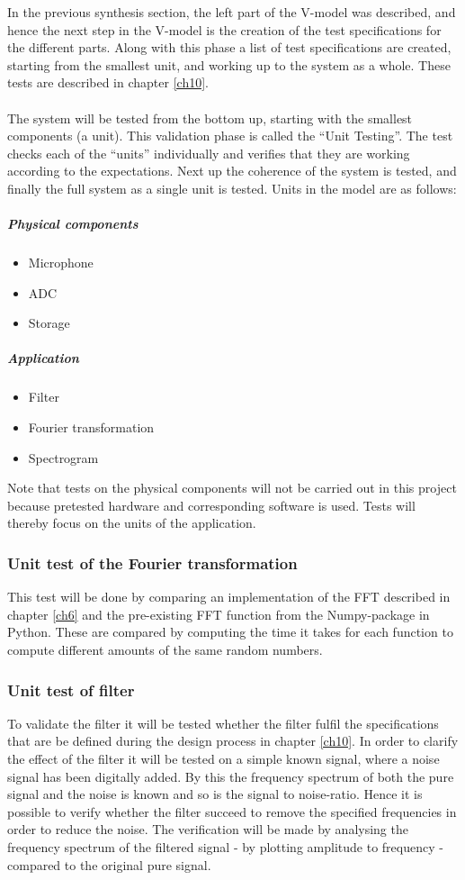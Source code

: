 In the previous synthesis section, the left part of the V-model was described, and hence the next step in the V-model is the creation of the test specifications for the different parts. Along with this phase a list of test specifications are created, starting from the smallest unit, and working up to the system as a whole. These tests are described in chapter \ref{ch10}.
\\ \\
The system will be tested from the bottom up, starting with the smallest components (a unit). This validation phase is called the ``Unit Testing''. The test checks each of the ``units'' individually and verifies that they are working according to the expectations. Next up the coherence of the system is tested, and finally the full system as a single unit is tested. Units in the model are as follows:
\subparagraph{Physical components}  
\begin{itemize}
	\item Microphone
	\item ADC
	\item Storage
\end{itemize}
\subparagraph{Application}
\begin{itemize}
	\item Filter
	\item Fourier transformation
	\item Spectrogram
\end{itemize}
Note that tests on the physical components will not be carried out in this project because pretested hardware and corresponding software is used. Tests will thereby focus on the units of the application.\\ 
 
\subsubsection{Unit test of the Fourier transformation}
This test will be done by comparing an implementation of the FFT described in chapter \ref{ch6} and the pre-existing FFT function from the Numpy-package in Python. These are compared by computing the time it takes for each function to compute different amounts of the same random numbers.

\subsubsection{Unit test of filter}
To validate the filter it will be tested whether the filter fulfil the specifications that are be defined during the design process in chapter \ref{ch10}. In order to clarify the effect of the filter it will be tested on a simple known signal, where a noise signal has been digitally added. By this the frequency spectrum of both the pure signal and the noise is known and so is the signal to noise-ratio. Hence it is possible to verify whether the filter succeed to remove the specified frequencies in order to reduce the noise. The verification will be made by analysing the frequency spectrum of the filtered signal - by plotting amplitude to frequency - compared to the original pure signal. 

